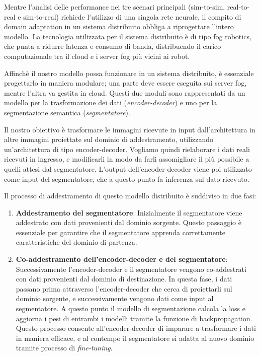 \documentclass[12pt]{report}
\begin{document}
Mentre l'analisi delle performance nei tre scenari principali (sim-to-sim, real-to-real e sim-to-real) richiede l'utilizzo di una singola rete neurale, il compito di domain adaptation in un sistema distribuito obbliga a riprogettare l'intero modello. La tecnologia utilizzata per il sistema distribuito è di tipo fog robotics,  che punta a ridurre latenza e consumo di banda, distribuendo il carico computazionale tra il cloud e i server fog più vicini ai robot.

Affinchè il nostro modello possa funzionare in un sistema distribuito, è essenziale progettarlo in maniera modulare; una parte deve essere eseguita sui server fog, mentre l'altra va gestita in cloud. Questi due moduli sono rappresentati da un modello per la trasformazione dei dati (\textit{encoder-decoder}) e uno per la segmentazione semantica (\textit{segmentatore}).

Il nostro obiettivo è trasformare le immagini ricevute in input dall'architettura in altre immagini proiettate sul dominio di addestramento, utilizzando un'architettura di tipo encoder-decoder. Vogliamo quindi rielaborare i dati reali ricevuti in ingresso, e modificarli in modo da farli assomigliare il più possibile a quelli attesi dal segmentatore. L'output dell'encoder-decoder viene poi utilizzato come input del segmentatore, che a questo punto fa inferenza sul dato ricevuto.

Il processo di addestramento di questo modello distribuito è suddiviso in due fasi:

\begin{enumerate}
	\item \textbf{Addestramento del segmentatore}: Inizialmente il segmentatore viene addestrato con dati provenienti dal dominio sorgente. Questo passaggio è essenziale per garantire che il segmentatore apprenda correttamente caratteristiche del dominio di partenza.
	
	\item \textbf{Co-addestramento dell'encoder-decoder e del segmentatore}: Successivamente l'encoder-decoder e il segmentatore vengono co-addestrati con dati provenienti dal dominio di destinazione. In questa fase, i dati passano prima attraverso l'encoder-decoder che cerca di proiettarli sul dominio sorgente, e successivamente vengono dati come input al segmentatore. A questo punto il modello di segmentazione calcola la loss e aggiorna i pesi di entrambi i modelli tramite la funzione di backpropagation. Questo processo consente all'encoder-decoder di imparare a trasformare i dati in maniera efficace, e al contempo il segmentatore si adatta al nuovo dominio tramite processo di \textit{fine-tuning}.
\end{enumerate}
\end{document}
